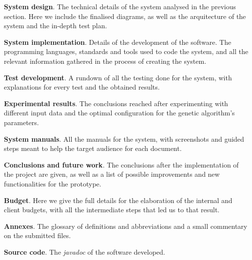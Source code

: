 \textbf{System design}. The technical details of the system analysed in the previous section. Here we include the finalised diagrams, as well as the arquitecture of the system and the in-depth test plan.

\textbf{System implementation}. Details of the development of the software. The programming languages, standards and tools used to code the system, and all the relevant information gathered in the process of creating the system.

\textbf{Test development}. A rundown of all the testing done for the system, with explanations for every test and the obtained results. 

\textbf{Experimental results}. The conclusions reached after experimenting with different input data and the optimal configuration for the genetic algorithm's parameters. 

\textbf{System manuals}. All the manuals for the system, with screenshots and guided steps meant to help the target audience for each document. 

\textbf{Conclusions and future work}. The conclusions after the implementation of the project are given, as well as a list of possible improvements and new functionalities for the prototype. 

\textbf{Budget}. Here we give the full details for the elaboration of the internal and client budgets, with all the intermediate steps that led us to that result. 

\textbf{Annexes}. The glossary of definitions and abbreviations and a small commentary on the submitted files.

\textbf{Source code}. The \textit{javadoc} of the software developed. 

